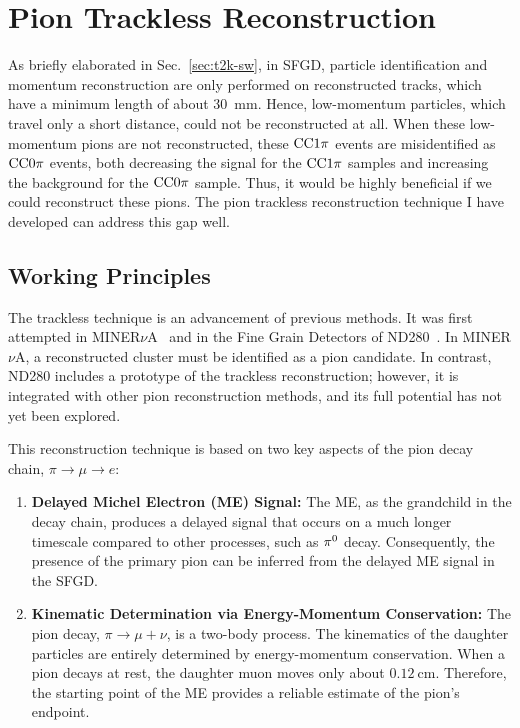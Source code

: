     \section{Pion Trackless Reconstruction}
       \label{sec:sel-tl}
          As briefly elaborated in Sec.~\ref{sec:t2k-sw}, in SFGD, particle identification and momentum reconstruction are only performed on reconstructed tracks, which have a minimum length of about $30$~mm. 
          Hence, low-momentum particles, which travel only a short distance, could not be reconstructed at all. 
          When these low-momentum pions are not reconstructed, these $\textrm{CC}1\pi$ events are misidentified as $\textrm{CC}0\pi$ events, both decreasing the signal for the $\textrm{CC}1\pi$ samples and increasing the background for the $\textrm{CC}0\pi$ sample. 
          Thus, it would be highly beneficial if we could reconstruct these pions. 
          The pion trackless reconstruction technique I have developed can address this gap well.

          \subsection{Working Principles}
          \label{sec:tl-wp}
          The trackless technique is an advancement of previous methods. 
          It was first attempted in MINER$\nu$A~\cite{poster:minerva-pime} and in the Fine Grain Detectors of ND280~\cite{poster:minerva-pime}. 
          In MINER$\nu$A, a reconstructed cluster must be identified as a pion candidate. 
          In contrast, ND280 includes a prototype of the trackless reconstruction; however, it is integrated with other pion reconstruction methods, and its full potential has not yet been explored.

          This reconstruction technique is based on two key aspects of the pion decay chain, $\pi \rightarrow \mu \rightarrow e$:

          \begin{enumerate}
          \item \textbf{Delayed Michel Electron (ME) Signal:} The ME, as the grandchild in the decay chain, produces a delayed signal that occurs on a much longer timescale compared to other processes, such as $\pi^0$ decay. 
          Consequently, the presence of the primary pion can be inferred from the delayed ME signal in the SFGD.
          
          \item \textbf{Kinematic Determination via Energy-Momentum Conservation:} The pion decay, $\pi \rightarrow \mu + \nu$, is a two-body process. 
          The kinematics of the daughter particles are entirely determined by energy-momentum conservation. 
          When a pion decays at rest, the daughter muon moves only about $0.12~\textrm{cm}$. 
          Therefore, the starting point of the ME provides a reliable estimate of the pion's endpoint.
          \end{enumerate}


